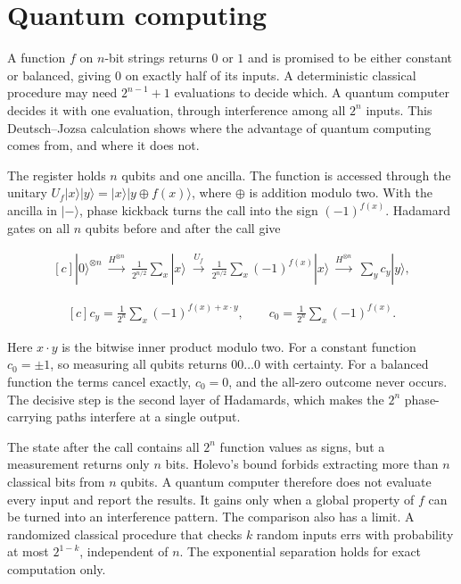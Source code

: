 \documentclass[11pt,oneside]{book}
\newenvironment{centeredalign}{\[\begin{gathered}[c]}{\end{gathered}\]}
\begin{document}
\clearpage

\section{Quantum computing}

\label{topic:quantum-computing}

A function \(f\) on \(n\)-bit strings returns \(0\) or \(1\) and is promised to be either constant or balanced, giving \(0\) on exactly half of its inputs. A deterministic classical procedure may need \(2^{n-1}+1\) evaluations to decide which. A quantum computer decides it with one evaluation, through interference among all \(2^n\) inputs. This Deutsch--Jozsa calculation shows where the advantage of quantum computing comes from, and where it does not.

The register holds \(n\) qubits and one ancilla. The function is accessed through the unitary \(U_f|x\rangle|y\rangle=|x\rangle|y\oplus f(x)\rangle\), where \(\oplus\) is addition modulo two. With the ancilla in \(|-\rangle\), phase kickback turns the call into the sign \((-1)^{f(x)}\). Hadamard gates on all \(n\) qubits before and after the call give

\begin{centeredalign}
|0\rangle^{\otimes n}\ \xrightarrow{H^{\otimes n}}\ \frac{1}{2^{n/2}}\sum_x|x\rangle
\ \xrightarrow{U_f}\ \frac{1}{2^{n/2}}\sum_x(-1)^{f(x)}|x\rangle
\ \xrightarrow{H^{\otimes n}}\ \sum_yc_y|y\rangle,
\end{centeredalign}

\begin{centeredalign}
c_y=\frac{1}{2^n}\sum_x(-1)^{f(x)+x\cdot y},\qquad c_{0}=\frac{1}{2^n}\sum_x(-1)^{f(x)}.
\end{centeredalign}

Here \(x\cdot y\) is the bitwise inner product modulo two. For a constant function \(c_0=\pm1\), so measuring all qubits returns \(00\ldots0\) with certainty. For a balanced function the terms cancel exactly, \(c_0=0\), and the all-zero outcome never occurs. The decisive step is the second layer of Hadamards, which makes the \(2^n\) phase-carrying paths interfere at a single output.

The state after the call contains all \(2^n\) function values as signs, but a measurement returns only \(n\) bits. Holevo's bound forbids extracting more than \(n\) classical bits from \(n\) qubits. A quantum computer therefore does not evaluate every input and report the results. It gains only when a global property of \(f\) can be turned into an interference pattern. The comparison also has a limit. A randomized classical procedure that checks \(k\) random inputs errs with probability at most \(2^{1-k}\), independent of \(n\). The exponential separation holds for exact computation only.
\end{document}
